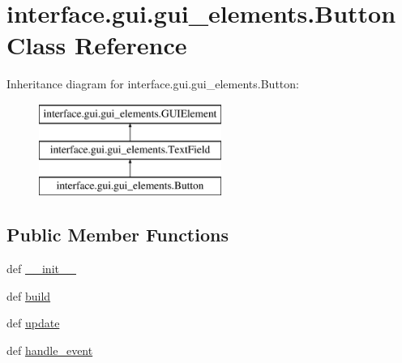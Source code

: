 \hypertarget{classinterface_1_1gui_1_1gui__elements_1_1_button}{\section{interface.\-gui.\-gui\-\_\-elements.\-Button \-Class \-Reference}
\label{classinterface_1_1gui_1_1gui__elements_1_1_button}
}
\-Inheritance diagram for interface.\-gui.\-gui\-\_\-elements.\-Button\-:\begin{figure}[H]
\begin{center}
\leavevmode
\includegraphics[height=3.000000cm]{classinterface_1_1gui_1_1gui__elements_1_1_button}
\end{center}
\end{figure}
\subsection*{\-Public \-Member \-Functions}
\begin{DoxyCompactItemize}
\item 
def \hyperlink{classinterface_1_1gui_1_1gui__elements_1_1_button_ab0a26af6cc27814c29cf8910d28526dd}{\-\_\-\-\_\-init\-\_\-\-\_\-}
\item 
def \hyperlink{classinterface_1_1gui_1_1gui__elements_1_1_button_aaee1404cd21fadc265aa57988eeaa0e7}{build}
\item 
def \hyperlink{classinterface_1_1gui_1_1gui__elements_1_1_button_ac462f1526cac2a2fe59391358a5c2ccd}{update}
\item 
def \hyperlink{classinterface_1_1gui_1_1gui__elements_1_1_button_aa448e714d2ce8e637f05f8031c5441fb}{handle\-\_\-event}
\end{DoxyCompactItemize}
